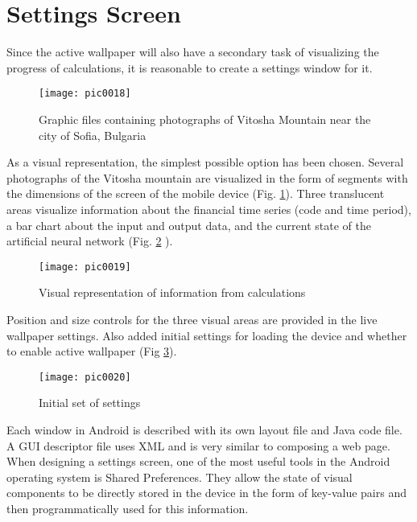 \section{Settings Screen}

Since the active wallpaper will also have a secondary task of visualizing the progress of calculations, it is reasonable to create a settings window for it.

\begin{figure}[h]
\centering
\texttt{[image: pic0018]}
\caption{Graphic files containing photographs of Vitosha Mountain near the city of Sofia, Bulgaria}
\label{fig:pic0018}
\end{figure}
\FloatBarrier

As a visual representation, the simplest possible option has been chosen. Several photographs of the Vitosha mountain are visualized in the form of segments with the dimensions of the screen of the mobile device (Fig. \ref{fig:pic0018}). Three translucent areas visualize information about the financial time series (code and time period), a bar chart about the input and output data, and the current state of the artificial neural network (Fig. \ref{fig:pic0019} ).

\begin{figure}[h]
\centering
\texttt{[image: pic0019]}
\caption{Visual representation of information from calculations}
\label{fig:pic0019}
\end{figure}
\FloatBarrier

Position and size controls for the three visual areas are provided in the live wallpaper settings. Also added initial settings for loading the device and whether to enable active wallpaper (Fig \ref{fig:pic0020}).

\begin{figure}[h]
\centering
\texttt{[image: pic0020]}
\caption{Initial set of settings}
\label{fig:pic0020}
\end{figure}
\FloatBarrier

Each window in Android is described with its own layout file and Java code file. A GUI descriptor file uses XML and is very similar to composing a web page. When designing a settings screen, one of the most useful tools in the Android operating system is Shared Preferences. They allow the state of visual components to be directly stored in the device in the form of key-value pairs and then programmatically used for this information.

